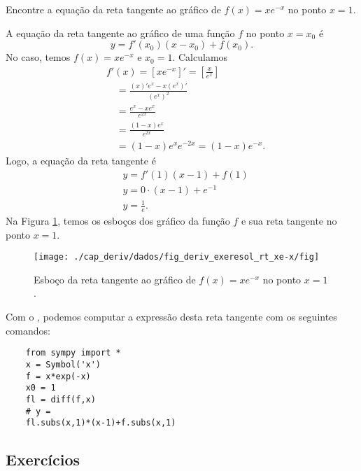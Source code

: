 \begin{exeresol}
  Encontre a equação da reta tangente ao gráfico de $f(x) = xe^{-x}$ no ponto $x=1$.
\end{exeresol}
\begin{resol}
  A equação da reta tangente ao gráfico de uma função $f$ no ponto $x=x_0$ é
  \begin{equation}
    y = f'(x_0)(x-x_0)+f(x_0).
  \end{equation}
  No caso, temos $f(x)=xe^{-x}$ e $x_0=1$. Calculamos
  \begin{align}
    & f'(x) = [xe^{-x}]' = \left[\frac{x}{e^x}\right] \\
    & \text{}\quad = \frac{(x)'e^x-x(e^x)'}{(e^x)^2} \\
    & \text{}\quad = \frac{e^x-xe^x}{e^{2x}} \\
    & \text{}\quad = \frac{(1-x)e^x}{e^{2x}} \\
    & \text{}\quad = (1-x)e^xe^{-2x} = (1-x)e^{-x}.
  \end{align}
  Logo, a equação da reta tangente é
  \begin{align}
    & y = f'(1)(x-1)+f(1) \\
    & y = 0\cdot (x-1) + e^{-1} \\
    & y = \frac{1}{e}.
  \end{align}
  Na Figura \ref{fig:deriv_exeresol_rt_xe-x}, temos os esboços dos gráfico da função $f$ e sua reta tangente no ponto $x=1$.

  \begin{figure}[H]
    \centering
    \texttt{[image: ./cap\_deriv/dados/fig\_deriv\_exeresol\_rt\_xe-x/fig]}
    \caption{Esboço da reta tangente ao gráfico de $f(x)=xe^{-x}$ no ponto $x=1$.}
    \label{fig:deriv_exeresol_rt_xe-x}
  \end{figure}

  \ifispython
  Com o \sympy, podemos computar a expressão desta reta tangente com os seguintes comandos:
  \begin{lstlisting}
    from sympy import *
    x = Symbol('x')
    f = x*exp(-x)
    x0 = 1
    fl = diff(f,x)
    # y = 
    fl.subs(x,1)*(x-1)+f.subs(x,1)
  \end{lstlisting}
  \fi
\end{resol}

\subsection{Exercícios}

